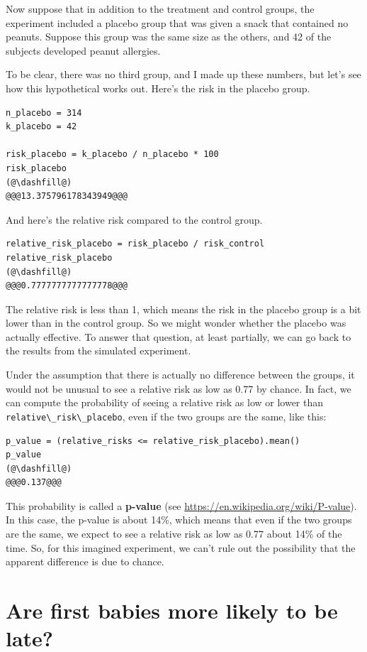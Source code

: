 Now suppose that in addition to the treatment and control groups, the
experiment included a placebo group that was given a snack that
contained no peanuts. Suppose this group was the same size as the
others, and 42 of the subjects developed peanut allergies.

To be clear, there was no third group, and I made up these numbers, but
let's see how this hypothetical works out. Here's the risk in the
placebo group.

\begin{lstlisting}[]
n_placebo = 314
k_placebo = 42

risk_placebo = k_placebo / n_placebo * 100
risk_placebo
(@\dashfill@)
@@@13.375796178343949@@@
\end{lstlisting}

And here's the relative risk compared to the control group.

\begin{lstlisting}[]
relative_risk_placebo = risk_placebo / risk_control
relative_risk_placebo
(@\dashfill@)
@@@0.7777777777777778@@@
\end{lstlisting}

The relative risk is less than 1, which means the risk in the placebo
group is a bit lower than in the control group. So we might wonder
whether the placebo was actually effective. To answer that question, at
least partially, we can go back to the results from the simulated
experiment.

Under the assumption that there is actually no difference between the
groups, it would not be unusual to see a relative risk as low as 0.77 by
chance. In fact, we can compute the probability of seeing a relative
risk as low or lower than
\passthrough{\lstinline!relative\_risk\_placebo!}, even if the two
groups are the same, like this:

\begin{lstlisting}[]
p_value = (relative_risks <= relative_risk_placebo).mean()
p_value
(@\dashfill@)
@@@0.137@@@
\end{lstlisting}

This probability is called a \textbf{p-value} (see
\url{https://en.wikipedia.org/wiki/P-value}). In this case, the p-value
is about 14\%, which means that even if the two groups are the same, we
expect to see a relative risk as low as 0.77 about 14\% of the time. So,
for this imagined experiment, we can't rule out the possibility that the
apparent difference is due to chance.

\hypertarget{are-first-babies-more-likely-to-be-late}{%
\section{Are first babies more likely to be
late?}\label{are-first-babies-more-likely-to-be-late}}

